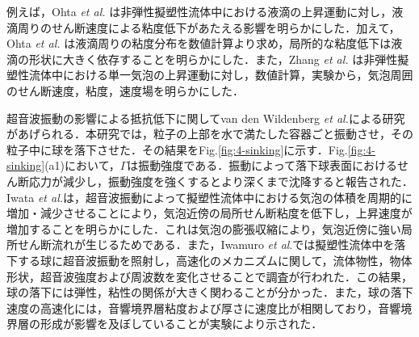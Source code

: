 例えば，Ohta {\it et al.} \cite{ref:2}は非弾性擬塑性流体中における液滴の上昇運動に対し，液滴周りのせん断速度による粘度低下があたえる影響を明らかにした．加えて，Ohta {\it et al.} \cite{ref:3}は液滴周りの粘度分布を数値計算より求め，局所的な粘度低下は液滴の形状に大きく依存することを明らかにした．また，Zhang {\it et al.} \cite{ref:4}は非弾性擬塑性流体中における単一気泡の上昇運動に対し，数値計算，実験から，気泡周囲のせん断速度，粘度，速度場を明らかにした．

超音波振動の影響による抵抗低下に関してvan den Wildenberg {\it et al.}\cite{ref:6}による研究があげられる．本研究では，粒子の上部を水で満たした容器ごと振動させ，その粒子中に球を落下させた．その結果をFig.\ref{fig:4-sinking}に示す．Fig.\ref{fig:4-sinking}(a1)において，$\Gamma$は振動強度である．振動によって落下球表面におけるせん断応力が減少し，振動強度を強くするとより深くまで沈降すると報告された．Iwata {\it et al.}\cite{ref:5}は，超音波振動によって擬塑性流体中における気泡の体積を周期的に増加・減少させることにより，気泡近傍の局所せん断粘度を低下し，上昇速度が増加することを明らかにした．これは気泡の膨張収縮により，気泡近傍に強い局所せん断流れが生じるためである．また，Iwamuro \textit{et al}.\cite{ref:8}では擬塑性流体中を落下する球に超音波振動を照射し，高速化のメカニズムに関して，流体物性，物体形状，超音波強度および周波数を変化させることで調査が行われた．この結果，球の落下には弾性，粘性の関係が大きく関わることが分かった．また，球の落下速度の高速化には，音響境界層粘度および厚さに速度比が相関しており，音響境界層の形成が影響を及ぼしていることが実験により示された．


